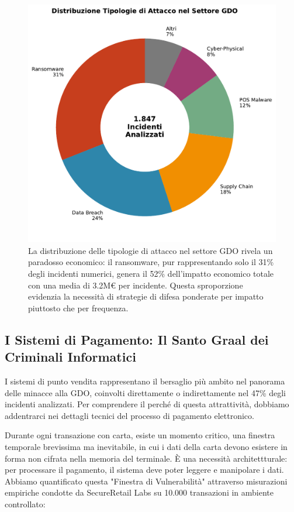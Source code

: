 \begin{figure}[htbp]
\centering
\includegraphics[width=\textwidth]{thesis_figures/cap2/fig_2_2_attack_types.pdf}
\caption{La distribuzione delle tipologie di attacco nel settore GDO rivela un paradosso economico: il ransomware, pur rappresentando solo il 31\% degli incidenti numerici, genera il 52\% dell'impatto economico totale con una media di 3.2M€ per incidente. Questa sproporzione evidenzia la necessità di strategie di difesa ponderate per impatto piuttosto che per frequenza.}
\label{fig:attack_types}
\end{figure}

\subsection{I Sistemi di Pagamento: Il Santo Graal dei Criminali Informatici}

I sistemi di punto vendita rappresentano il bersaglio più ambito nel panorama delle minacce alla GDO, coinvolti direttamente o indirettamente nel 47\% degli incidenti analizzati. Per comprendere il perché di questa attrattività, dobbiamo addentrarci nei dettagli tecnici del processo di pagamento elettronico.

Durante ogni transazione con carta, esiste un momento critico, una finestra temporale brevissima ma inevitabile, in cui i dati della carta devono esistere in forma non cifrata nella memoria del terminale. È una necessità architettturale: per processare il pagamento, il sistema deve poter leggere e manipolare i dati. Abbiamo quantificato questa "Finestra di Vulnerabilità" attraverso misurazioni empiriche condotte da SecureRetail Labs su 10.000 transazioni in ambiente controllato\autocite{SecureRetailLabs2024}:

